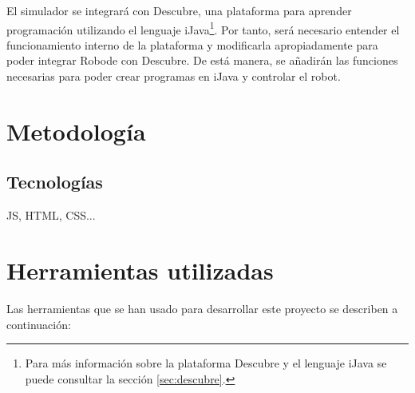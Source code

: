 El simulador se integrará con Descubre, una plataforma para aprender programación utilizando el lenguaje iJava\footnote{Para más información sobre la plataforma Descubre y el lenguaje iJava se puede consultar la sección \ref{sec:descubre}.}. Por tanto, será necesario entender el funcionamiento interno de la plataforma y modificarla apropiadamente para poder integrar Robode con Descubre. De está manera, se añadirán las funciones necesarias para poder crear programas en iJava y controlar el robot.


\section{Metodología}
\label{sec:metodologia}




\subsection{Tecnologías}
\label{sec:tecnologias}

{\color{blue}
JS, HTML, CSS...
}



\section{Herramientas utilizadas}
\label{sec:herramientas}

Las herramientas que se han usado para desarrollar este proyecto se describen a continuación:

